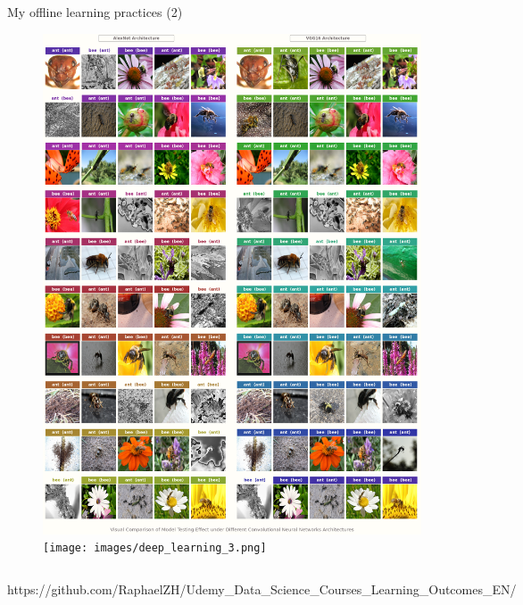 \documentclass{beamer}
\begin{document}
\begin{frame}[fragile]{My offline learning practices (2)}
\begin{figure}[!htb]
			\centering\includegraphics[width=\linewidth]{images/deep_learning_2.png}
			\endminipage\hfill
			\centering\texttt{[image: images/deep\_learning\_3.png]}
			\endminipage
		\end{figure}
		\vspace{-.4em}
		\begin{columns}
			\normalfont\footnotesize{https://github.com/RaphaelZH/Udemy\_Data\_Science\_Courses\_Learning\_Outcomes\_EN/}
		\end{columns}
	\end{frame}
	
\end{document}
